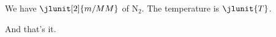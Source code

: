 \documentclass{article}
\begin{document}
    We have $ \jlunit[2]{m / MM} $ of N$_2$. The temperature is $ \jlunit{T} $.

    And that's it.
\end{document}
